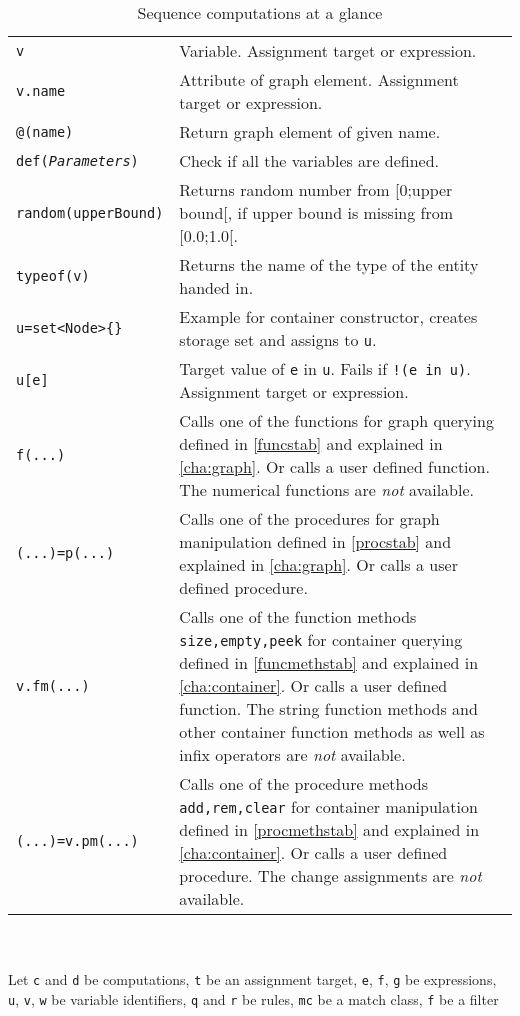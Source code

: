 \begin{table}[htbp]
\begin{minipage}{\linewidth}
\begin{tabularx}{\linewidth}{|lX|}
\hline
\texttt{v} & Variable. Assignment target or expression.\\
\texttt{v.name} & Attribute of graph element. Assignment target or expression.\\
\texttt{@(name)} & Return graph element of given name.\\
\texttt{def(\emph{Parameters})} & Check if all the variables are defined.\\
\texttt{random(upperBound)} & Returns random number from [0;upper bound[, if upper bound is missing from [0.0;1.0[.\\
\texttt{typeof(v)} & Returns the name of the type of the entity handed in.\\
\hline
\texttt{u=set<Node>\{\}} & Example for container constructor, creates storage set and assigns to \texttt{u}.\\
\texttt{u[e]} & Target value of \texttt{e} in \texttt{u}. Fails if \texttt{!(e in u)}. Assignment target or expression.\\
\hline
\texttt{f(...)} & Calls one of the functions for graph querying defined in \ref{funcstab} and explained in \ref{cha:graph}. Or calls a user defined function. The numerical functions are \emph{not} available.\\
\hline
\texttt{(...)=p(...)} & Calls one of the procedures for graph manipulation defined in \ref{procstab} and explained in \ref{cha:graph}. Or calls a user defined procedure.\\
\hline
\texttt{v.fm(...)} & Calls one of the function methods \texttt{size,empty,peek} for container querying defined in \ref{funcmethstab} and explained in \ref{cha:container}. Or calls a user defined function. The string function methods and other container function methods as well as infix operators are \emph{not} available.\\
\hline
\texttt{(...)=v.pm(...)} & Calls one of the procedure methods \texttt{add,rem,clear} for container manipulation defined in \ref{procmethstab} and explained in \ref{cha:container}. Or calls a user defined procedure. The change assignments are \emph{not} available.\\
\hline
\end{tabularx}
\end{minipage}\\
\\ 
{\small Let \texttt{c} and \texttt{d} be computations, \texttt{t} be an assignment target, \texttt{e}, \texttt{f}, \texttt{g} be expressions, \texttt{u}, \texttt{v}, \texttt{w} be variable identifiers, \texttt{q} and \texttt{r} be rules, \texttt{mc} be a match class, \texttt{f} be a filter }
\caption{Sequence computations at a glance}
\label{comptab}
\end{table}
 
